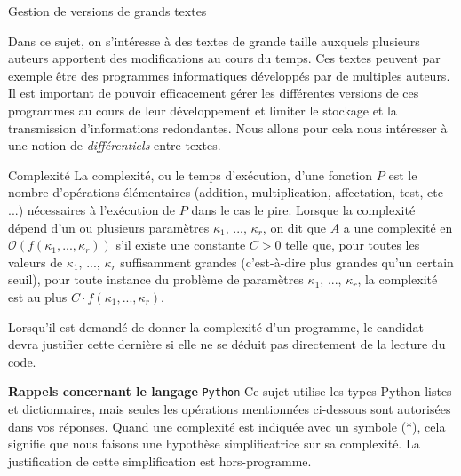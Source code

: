 Gestion de versions de grands textes 

Dans ce sujet, on s'intéresse à des textes de grande taille auxquels plusieurs auteurs apportent
des modifications au cours du temps. Ces textes peuvent par exemple être des programmes
informatiques développés par de multiples auteurs. Il est important de pouvoir efficacement
gérer les différentes versions de ces programmes au cours de leur développement et limiter le
stockage et la transmission d'informations redondantes. Nous allons pour cela nous intéresser à
une notion de \textit{différentiels} entre textes. 

\begin{defi}{Complexité}
La complexité, ou le temps d'exécution, d'une fonction $P$ est le nombre d'opérations élémentaires (addition, multiplication, affectation, test, etc ...) nécessaires à l'exécution
de $P$ dans le cas le pire. Lorsque la complexité dépend d'un ou plusieurs paramètres $\kappa_1$, ..., $\kappa_r$, on dit que $A$ a une complexité en $\mathcal{O}\left( f \left(\kappa_1, ..., \kappa_r  \right)\right)$ s'il existe une constante $C > 0$ telle que,
pour toutes les valeurs de $\kappa_1$, ..., $\kappa_r$ suffisamment grandes (c'est-à-dire plus grandes qu'un certain seuil), pour toute instance du problème de paramètres $\kappa_1$, ..., $\kappa_r$, la complexité est au plus
$C \cdot f \left(\kappa_1, ..., \kappa_r  \right)$.
\end{defi}

Lorsqu'il est demandé de donner la complexité d'un programme, le candidat devra justifier
cette dernière si elle ne se déduit pas directement de la lecture du code. 

\textbf{Rappels concernant le langage}  \texttt{Python}
Ce sujet utilise les types Python listes et dictionnaires, mais seules les opérations mentionnées ci-dessous sont autorisées dans vos réponses. Quand une complexité est indiquée avec un symbole (*), cela signifie que nous faisons une hypothèse
simplificatrice sur sa complexité. La justification de cette simplification est hors-programme. 


